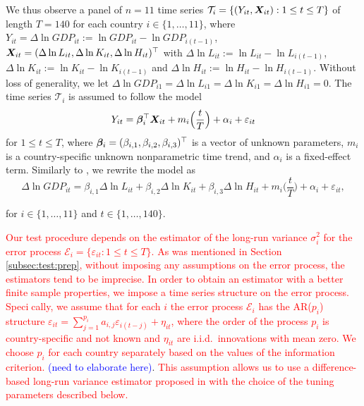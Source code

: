 \documentclass[a4paper,12pt]{article}
\makeatletter
\renewcommand{\eqref}[1]{\tagform@{\ref{#1}}}
\makeatother
\begin{document}
We thus observe a panel of $n = 11$ time series $\mathcal{T}_i = \{(Y_{it}, \boldsymbol{X}_{it}): 1 \le t \le T \}$ of length $T = 140$ for each country $i \in \{1,\ldots,11\}$, where $Y_{it} = \Delta \ln GDP_{it} := \ln GDP_{it} - \ln GDP_{i(t-1)}$, $\boldsymbol{X}_{it} = (\Delta \ln L_{it}, \Delta \ln K_{it}, \Delta \ln H_{it})^\top$ with $\Delta \ln L_{it} := \ln L_{it} - \ln L_{i(t-1)}$, $\Delta \ln K_{it} := \ln K_{it} - \ln K_{i(t-1)}$ and $\Delta \ln H_{it} := \ln H_{it} - \ln H_{i(t-1)}$. Without loss of generality, we let $\Delta \ln GDP_{i1} = \Delta \ln L_{i1} = \Delta \ln K_{i1} = \Delta \ln H_{i1} = 0$. The time series $\mathcal{T}_i$ is assumed to follow the model 
\begin{equation}\label{eq:model:app}
Y_{it} = \bm{\beta}^\top_i \boldsymbol{X}_{it} + m_i \Big( \frac{t}{T} \Big) + \alpha_i + \varepsilon_{it} 
\end{equation}
for $1 \le t \le T$, where $\bm{\beta}_i = (\beta_{i, 1}, \beta_{i, 2}, \beta_{i, 3})^\top$ is a vector of unknown parameters, $m_i$ is a country-specific unknown nonparametric time trend, and $\alpha_i$ is a fixed-effect term. Similarly to \cite{Zhang2012}, we rewrite the model \eqref{eq:model:app} as
\begin{equation}\label{eq:model:app2}
\Delta \ln GDP_{it} = \beta_{i, 1} \Delta \ln L_{it} + \beta_{i, 2} \Delta \ln K_{it} + \beta_{i, 3} \Delta \ln H_{it} + m_i \Big( \frac{t}{T} \Big) + \alpha_i + \varepsilon_{it},
\end{equation}

for $i \in \{1, \ldots, 11\}$ and $t \in \{1, \ldots, 140\}$.

\textcolor{red}{Our test procedure depends on the estimator of the long-run variance $\sigma_i^2$ for the error process $\mathcal{E}_i = \{\varepsilon_{it}: 1 \le t \le T\}$. As was mentioned in Section \ref{subsec:test:prep}, without imposing any assumptions on the error process, the estimators tend to be imprecise. In order to obtain an estimator with a better finite sample properties, we impose a time series structure on the error process. Specically, we assume that for each $i$ the error process $\mathcal{E}_i$ has the AR($p_i$) structure $\varepsilon_{it} = \sum_{j=1}^{p_i} a_{i, j} \varepsilon_{i(t-j)} + \eta_{it}$, where the order of the process $p_i$ is country-specific and not known and $\eta_{it}$ are i.i.d.\ innovations with mean zero. We choose $p_i$ for each country separately based on the values of the information criterion.} \textcolor{blue}{(need to elaborate here)}. \textcolor{red}{This assumption allows us to use a difference-based long-run variance estimator proposed in \cite{KhismatullinaVogt2020} with the choice of the tuning parameters described below.}
\end{document}
